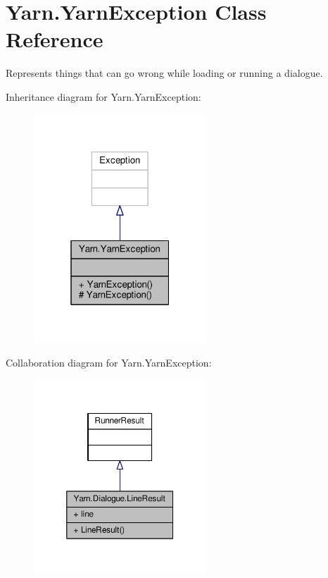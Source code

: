 \hypertarget{a00194}{\section{Yarn.\-Yarn\-Exception Class Reference}
\label{a00194}
}


Represents things that can go wrong while loading or running a dialogue.  




Inheritance diagram for Yarn.\-Yarn\-Exception\-:
\nopagebreak
\begin{figure}[H]
\begin{center}
\leavevmode
\includegraphics[width=184pt]{a00604}
\end{center}
\end{figure}


Collaboration diagram for Yarn.\-Yarn\-Exception\-:
\nopagebreak
\begin{figure}[H]
\begin{center}
\leavevmode
\includegraphics[width=184pt]{a00605}
\end{center}
\end{figure}
